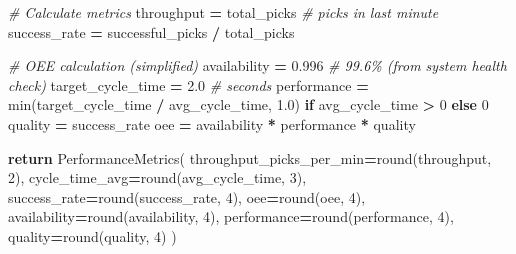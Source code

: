 \documentclass[
]{article}
\newenvironment{Shaded}{\begin{snugshade}}{\end{snugshade}}
\newcommand{\BuiltInTok}[1]{#1}
\newcommand{\CommentTok}[1]{\textcolor[rgb]{0.56,0.35,0.01}{\textit{#1}}}
\newcommand{\ControlFlowTok}[1]{\textcolor[rgb]{0.13,0.29,0.53}{\textbf{#1}}}
\newcommand{\DecValTok}[1]{\textcolor[rgb]{0.00,0.00,0.81}{#1}}
\newcommand{\FloatTok}[1]{\textcolor[rgb]{0.00,0.00,0.81}{#1}}
\newcommand{\NormalTok}[1]{#1}
\newcommand{\OperatorTok}[1]{\textcolor[rgb]{0.81,0.36,0.00}{\textbf{#1}}}
\begin{document}
\begin{Shaded}
\begin{Highlighting}[]
    \CommentTok{\# Calculate metrics}
\NormalTok{    throughput }\OperatorTok{=}\NormalTok{ total\_picks  }\CommentTok{\# picks in last minute}
\NormalTok{    success\_rate }\OperatorTok{=}\NormalTok{ successful\_picks }\OperatorTok{/}\NormalTok{ total\_picks}

    \CommentTok{\# OEE calculation (simplified)}
\NormalTok{    availability }\OperatorTok{=} \FloatTok{0.996}  \CommentTok{\# 99.6\% (from system health check)}
\NormalTok{    target\_cycle\_time }\OperatorTok{=} \FloatTok{2.0}  \CommentTok{\# seconds}
\NormalTok{    performance }\OperatorTok{=} \BuiltInTok{min}\NormalTok{(target\_cycle\_time }\OperatorTok{/}\NormalTok{ avg\_cycle\_time, }\FloatTok{1.0}\NormalTok{) }\ControlFlowTok{if}\NormalTok{ avg\_cycle\_time }\OperatorTok{\textgreater{}} \DecValTok{0} \ControlFlowTok{else} \DecValTok{0}
\NormalTok{    quality }\OperatorTok{=}\NormalTok{ success\_rate}
\NormalTok{    oee }\OperatorTok{=}\NormalTok{ availability }\OperatorTok{*}\NormalTok{ performance }\OperatorTok{*}\NormalTok{ quality}

    \ControlFlowTok{return}\NormalTok{ PerformanceMetrics(}
\NormalTok{        throughput\_picks\_per\_min}\OperatorTok{=}\BuiltInTok{round}\NormalTok{(throughput, }\DecValTok{2}\NormalTok{),}
\NormalTok{        cycle\_time\_avg}\OperatorTok{=}\BuiltInTok{round}\NormalTok{(avg\_cycle\_time, }\DecValTok{3}\NormalTok{),}
\NormalTok{        success\_rate}\OperatorTok{=}\BuiltInTok{round}\NormalTok{(success\_rate, }\DecValTok{4}\NormalTok{),}
\NormalTok{        oee}\OperatorTok{=}\BuiltInTok{round}\NormalTok{(oee, }\DecValTok{4}\NormalTok{),}
\NormalTok{        availability}\OperatorTok{=}\BuiltInTok{round}\NormalTok{(availability, }\DecValTok{4}\NormalTok{),}
\NormalTok{        performance}\OperatorTok{=}\BuiltInTok{round}\NormalTok{(performance, }\DecValTok{4}\NormalTok{),}
\NormalTok{        quality}\OperatorTok{=}\BuiltInTok{round}\NormalTok{(quality, }\DecValTok{4}\NormalTok{)}
\NormalTok{    )}


\end{Highlighting}
\end{Shaded}
\end{document}

